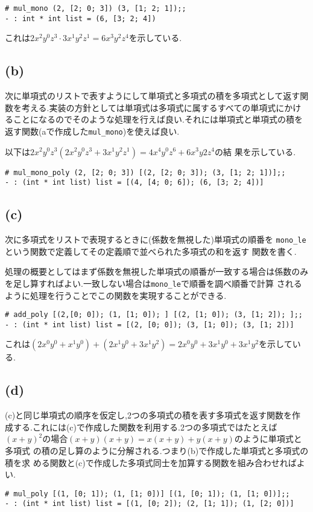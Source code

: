 \documentclass[11pt,a4j]{jarticle}
\begin{document}
\begin{lstlisting}[caption=実行結果]
# mul_mono (2, [2; 0; 3]) (3, [1; 2; 1]);;
- : int * int list = (6, [3; 2; 4])
\end{lstlisting}
これは$2x^2y^0z^3 \cdot 3x^1y^2z^1 = 6x^3y^2z^4$を示している.
\subsection*{(b)}
次に単項式のリストで表すようにして単項式と多項式の積を多項式として返す関
数を考える.実装の方針としては単項式は多項式に属するすべての単項式にかけ
ることになるのでそのような処理を行えば良い.それには単項式と単項式の積を
返す関数(aで作成した\verb|mul_mono|)を使えば良い.

以下は$2x^2y^0z^3 (2x^2y^0z^3 + 3x^1y^2z^1) = 4x^4y^0z^6 + 6x^3y2z^4$の結
果を示している.

\begin{lstlisting}[caption=実行結果]
# mul_mono_poly (2, [2; 0; 3]) [(2, [2; 0; 3]); (3, [1; 2; 1])];;
- : (int * int list) list = [(4, [4; 0; 6]); (6, [3; 2; 4])]
\end{lstlisting}
\subsection*{(c)}
次に多項式をリストで表現するときに(係数を無視した)単項式の順番を
\verb|mono_le|という関数で定義してその定義順で並べられた多項式の和を返す
関数を書く.

処理の概要としてはまず係数を無視した単項式の順番が一致する場合は係数のみ
を足し算すればよい.一致しない場合は\verb|mono_le|で順番を調べ順番で計算
されるように処理を行うことでこの関数を実現することができる.

\begin{lstlisting}[caption=実行結果]
# add_poly [(2,[0; 0]); (1, [1; 0]); ] [(2, [1; 0]); (3, [1; 2]); ];;
- : (int * int list) list = [(2, [0; 0]); (3, [1; 0]); (3, [1; 2])]  
\end{lstlisting}

これは$(2x^0y^0 + x^1y^0) + (2x^1y^0 + 3x^1y^2) = 2x^0y^0 + 3x^1y^0 +
3x^1y^2$を示している.
\subsection*{(d)}
(c)と同じ単項式の順序を仮定し,2つの多項式の積を表す多項式を返す関数を作
成する.これには(c)で作成した関数を利用する.2つの多項式ではたとえば
$(x+y)^2$の場合$(x+y)(x+y) = x(x + y) + y(x + y)$のように単項式と多項式
の積の足し算のように分解される.つまり(b)で作成した単項式と多項式の積を求
める関数と(c)で作成した多項式同士を加算する関数を組み合わせればよい.
\begin{lstlisting}[caption=実行結果]
# mul_poly [(1, [0; 1]); (1, [1; 0])] [(1, [0; 1]); (1, [1; 0])];;
- : (int * int list) list = [(1, [0; 2]); (2, [1; 1]); (1, [2; 0])]
\end{lstlisting}
\end{document}
